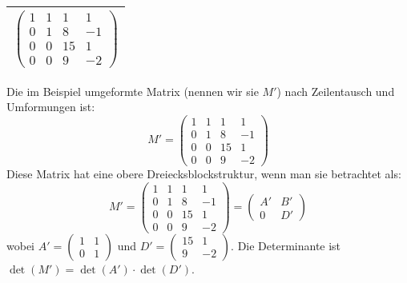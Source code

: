 \begin{longtable}{p{10cm}}
    $\displaystyle\begin{pmatrix}
    1 & 1 & 1 & 1 \\
    0 & 1 & 8 & -1 \\
    0 & 0 & 15 & 1 \\
    0 & 0 & 9 & -2
    \end{pmatrix}$\\\hline

\end{longtable}

Die im Beispiel umgeformte Matrix (nennen wir sie $M'$) nach Zeilentausch und Umformungen ist:
\[
M' = \begin{pmatrix}
    1 & 1 & 1 & 1 \\
    0 & 1 & 8 & -1 \\
    0 & 0 & 15 & 1 \\
    0 & 0 & 9 & -2
    \end{pmatrix}
\]
Diese Matrix hat eine obere Dreiecksblockstruktur, wenn man sie betrachtet als:
\[
M' = \left( \begin{array}{cc|cc}
1 & 1 & 1 & 1 \\
0 & 1 & 8 & -1 \\
\hline
0 & 0 & 15 & 1 \\
0 & 0 & 9 & -2
\end{array} \right)
= \begin{pmatrix} A' & B' \\ 0 & D' \end{pmatrix}
\]
wobei $A' = \begin{pmatrix} 1 & 1 \\ 0 & 1 \end{pmatrix}$ und $D' = \begin{pmatrix} 15 & 1 \\ 9 & -2 \end{pmatrix}$.
Die Determinante ist $\det(M') = \det(A') \cdot \det(D')$.

\bigskip

